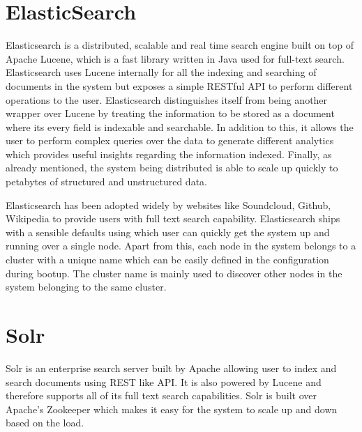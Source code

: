 \documentclass[a4paper,11pt]{kth-mag}
\begin{document}
\section{ElasticSearch}

Elasticsearch \cite{elasticsearch} is a distributed, scalable and real time search engine built on top of Apache Lucene, which is a fast library written in Java used for full-text search. Elasticsearch uses Lucene internally for all the indexing and searching of documents in the system but exposes a simple RESTful API to perform different operations to the user. Elasticsearch distinguishes itself from being another wrapper over Lucene by treating the information to be stored as a document where its every field is indexable and searchable. In addition to this, it allows the user to perform complex queries over the data to generate different analytics which provides useful insights regarding the information indexed. Finally, as already mentioned, the system being distributed is able to scale up quickly to petabytes of structured and unstructured data.

\par Elasticsearch has been adopted widely by websites like Soundcloud, Github, Wikipedia to provide users with full text search capability. Elasticsearch ships with a sensible defaults using which user can quickly get the system up and running over a single node. Apart from this, each node in the system belongs to a cluster with a unique name which can be easily defined in the configuration during bootup. The cluster name is mainly used to discover other nodes in the system belonging to the same cluster.

\section{Solr}

Solr \cite{solr} is an enterprise search server built by Apache allowing user to index and search documents using REST like API. It is also powered by Lucene and therefore supports all of its full text search capabilities. Solr is built over Apache's Zookeeper which makes it easy for the system to scale up and down based on the load.



\end{document}
